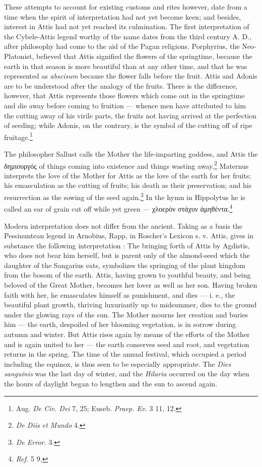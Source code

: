 \documentclass[a4paper, 11pt, oneside, polutonikogreek, english]{article}
\begin{document}
These attempts to account for existing customs and rites however, date from a time when the spirit of interpretation had not yet become keen; and besides, interest in Attis had not yet reached its culmination. The first interpretation of the Cybele-Attis legend worthy of the name dates from the third century A. D., after philosophy had come to the aid of the Pagan religions. Porphyrius, the Neo-Platonist, believed that Attis signified the flowers of the springtime, because the earth in that season is more beautiful than at any other time, and that he was represented as \emph{abscisum} because the flower falls before the fruit. Attis and Adonis are to be understood after the analogy of the fruits. There is the difference, however, that Attis represents those flowers which come out in the springtime and die away before coming to fruition --- whence men have attributed to him the cutting away of his virile parts, the fruits not having arrived at the perfection of seeding; while Adonis, on the contrary, is the symbol of the cutting off of ripe fruitage.\footnote{Aug. \emph{De Civ. Dei} 7, 25; Euseb. \emph{Praep. Ev.} 3 11, 12.}

The philosopher Sallust calls the Mother the life-imparting goddess, and Attis the δημιουργός of things coming into existence and things wasting away.\footnote{\emph{De Diis et Mundo} 4.} Maternus interprets the love of the Mother for Attis as the love of the earth for her fruits; his emasculation as the cutting of fruits; his death as their preservation; and his resurrection as the sowing of the seed again.\footnote{\emph{De Error.} 3.} In the hymn in Hippolytus he is called an ear of grain cut off while yet green --- χλοερὸν στάχυν ἀμηθέντα.\footnote{\emph{Ref.} 5 9.}

Modern interpretation does not differ from the ancient. Taking as a basis the Pessinuntean legend in Arnobius, Rapp, in Roscher's Lexicon s. v. Attis, gives in substance the following interpretation : The bringing forth of Attis by Agdistis, who does not bear him herself, but is parent only of the almond-seed which the daughter of the Sangarius eats, symbolizes the springing of the plant kingdom from the bosom of the earth. Attis, having grown to youthful beauty, and being beloved of the Great Mother, becomes her lover as well as her son. Having broken faith with her, he emasculates himself as punishment, and dies --- i. e., the beautiful plant growth, thriving luxuriantly up to midsummer, dies to the ground under the glowing rays of the sun. The Mother mourns her creation and buries him --- the earth, despoiled of her blooming vegetation, is in sorrow during autumn and winter. But Attis rises again by means of the efforts of the Mother and is again united to her --- the earth conserves seed and root, and vegetation returns in the spring. The time of the annual festival, which occupied a period including the equinox, is thus seen to be especially appropriate. The \emph{Dies sanguinis} was the last day of winter, and the \emph{Hilaria} occurred on the day when the hours of daylight began to lengthen and the sun to ascend again.
\end{document}
